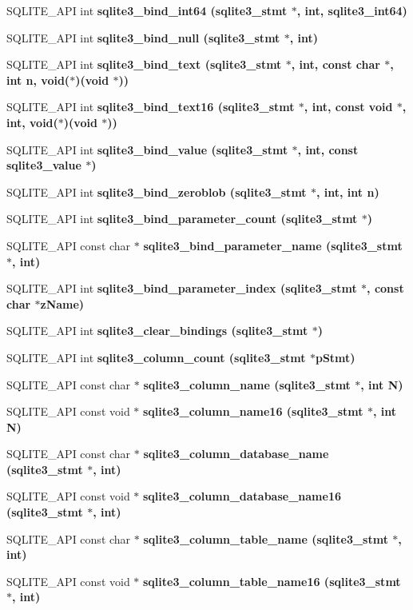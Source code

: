 \begin{CompactItemize}
\item 
SQLITE\_\-API int \bf{sqlite3\_\-bind\_\-int64} (\bf{sqlite3\_\-stmt} $\ast$, int, \bf{sqlite3\_\-int64})
\item 
SQLITE\_\-API int \bf{sqlite3\_\-bind\_\-null} (\bf{sqlite3\_\-stmt} $\ast$, int)
\item 
SQLITE\_\-API int \bf{sqlite3\_\-bind\_\-text} (\bf{sqlite3\_\-stmt} $\ast$, int, const char $\ast$, int n, void($\ast$)(void $\ast$))
\item 
SQLITE\_\-API int \bf{sqlite3\_\-bind\_\-text16} (\bf{sqlite3\_\-stmt} $\ast$, int, const void $\ast$, int, void($\ast$)(void $\ast$))
\item 
SQLITE\_\-API int \bf{sqlite3\_\-bind\_\-value} (\bf{sqlite3\_\-stmt} $\ast$, int, const \bf{sqlite3\_\-value} $\ast$)
\item 
SQLITE\_\-API int \bf{sqlite3\_\-bind\_\-zeroblob} (\bf{sqlite3\_\-stmt} $\ast$, int, int n)
\item 
SQLITE\_\-API int \bf{sqlite3\_\-bind\_\-parameter\_\-count} (\bf{sqlite3\_\-stmt} $\ast$)
\item 
SQLITE\_\-API const char $\ast$ \bf{sqlite3\_\-bind\_\-parameter\_\-name} (\bf{sqlite3\_\-stmt} $\ast$, int)
\item 
SQLITE\_\-API int \bf{sqlite3\_\-bind\_\-parameter\_\-index} (\bf{sqlite3\_\-stmt} $\ast$, const char $\ast$z\-Name)
\item 
SQLITE\_\-API int \bf{sqlite3\_\-clear\_\-bindings} (\bf{sqlite3\_\-stmt} $\ast$)
\item 
SQLITE\_\-API int \bf{sqlite3\_\-column\_\-count} (\bf{sqlite3\_\-stmt} $\ast$p\-Stmt)
\item 
SQLITE\_\-API const char $\ast$ \bf{sqlite3\_\-column\_\-name} (\bf{sqlite3\_\-stmt} $\ast$, int N)
\item 
SQLITE\_\-API const void $\ast$ \bf{sqlite3\_\-column\_\-name16} (\bf{sqlite3\_\-stmt} $\ast$, int N)
\item 
SQLITE\_\-API const char $\ast$ \bf{sqlite3\_\-column\_\-database\_\-name} (\bf{sqlite3\_\-stmt} $\ast$, int)
\item 
SQLITE\_\-API const void $\ast$ \bf{sqlite3\_\-column\_\-database\_\-name16} (\bf{sqlite3\_\-stmt} $\ast$, int)
\item 
SQLITE\_\-API const char $\ast$ \bf{sqlite3\_\-column\_\-table\_\-name} (\bf{sqlite3\_\-stmt} $\ast$, int)
\item 
SQLITE\_\-API const void $\ast$ \bf{sqlite3\_\-column\_\-table\_\-name16} (\bf{sqlite3\_\-stmt} $\ast$, int)
\item 

\end{CompactItemize}
